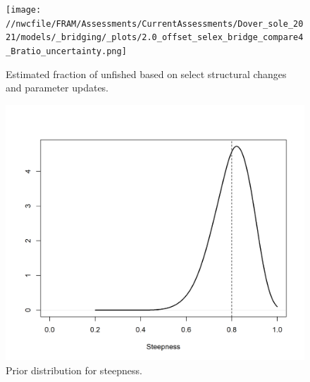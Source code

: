 \documentclass[11pt,
  english,
  a4paper,
]{article}
\begin{document}
\tagmcend\tagstructend


\begin{figure}
\centering
\texttt{[image: //nwcfile/FRAM/Assessments/CurrentAssessments/Dover\_sole\_2021/models/\_bridging/\_plots/2.0\_offset\_selex\_bridge\_compare4\_Bratio\_uncertainty.png]}
\caption{Estimated fraction of unfished based on select structural changes and parameter updates.\label{fig:structure-bridge-depl}}
\end{figure}

\tagmcend\tagstructend


\begin{figure}
\centering
\includegraphics[width=1\textwidth,height=1\textheight]{figs/h_prior.png}
\caption{Prior distribution for steepness.\label{fig:h-prior}}
\end{figure}

\tagmcend\tagstructend

\end{document}
